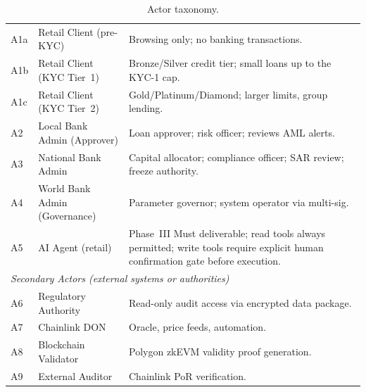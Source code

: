 \documentclass[12pt,a4paper]{report}
\begin{document}
\begin{table}[H]
\centering
\caption[Actor taxonomy]{Actor taxonomy.}
\label{tab:actor-taxonomy}
\begin{tabular}{p{1.2cm}p{4.2cm}p{7.9cm}}
A1a & Retail Client (pre-KYC) & Browsing only; no banking transactions. \\
A1b & Retail Client (KYC Tier~1) & Bronze/Silver credit tier; small loans up to the KYC-1 cap. \\
A1c & Retail Client (KYC Tier~2) & Gold/Platinum/Diamond; larger limits, group lending. \\
A2 & Local Bank Admin (Approver) & Loan approver; risk officer; reviews AML alerts. \\
A3 & National Bank Admin & Capital allocator; compliance officer; SAR review; freeze authority. \\
A4 & World Bank Admin (Governance) & Parameter governor; system operator via multi-sig. \\
A5 & AI Agent (retail) & Phase~III Must deliverable; read tools always permitted; write tools require explicit human confirmation gate before execution. \\
\multicolumn{3}{l}{\textit{Secondary Actors (external systems or authorities)}} \\
A6 & Regulatory Authority & Read-only audit access via encrypted data package. \\
A7 & Chainlink DON & Oracle, price feeds, automation. \\
A8 & Blockchain Validator & Polygon zkEVM validity proof generation. \\
A9 & External Auditor & Chainlink PoR verification. \\
\bottomrule
\end{tabular}
\end{table}
\end{document}
